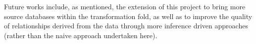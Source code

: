 \documentclass[12pt]{article}
\begin{document}
    Future works include, as mentioned, the extension of this project to bring more source databases within the transformation fold, as well as to improve the quality of relationships derived from the data through more inference driven approaches (rather than the naive approach undertaken here). 

    \newpage

    
    
\end{document}
